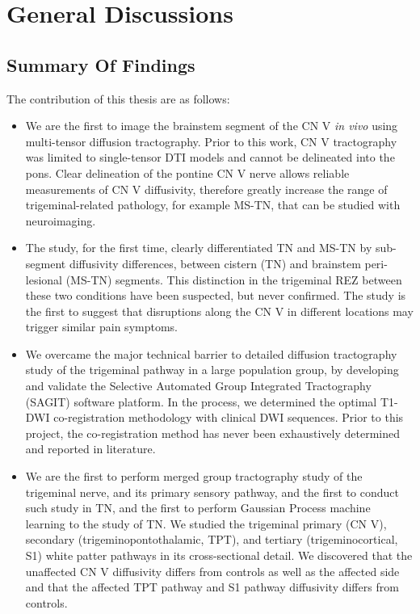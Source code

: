 \graphicspath{{images/discussions/}}

\chapter{General Discussions}

\section{Summary Of Findings}

The contribution of this thesis are as follows:

\begin{itemize}

\item We are the first to image the brainstem segment of the CN V \textit{in vivo} using multi-tensor diffusion tractography. Prior to this work, CN V tractography was limited to single-tensor DTI models and cannot be delineated into the pons. Clear delineation of the pontine CN V nerve allows reliable measurements of CN V diffusivity, therefore greatly increase the range of trigeminal-related pathology, for example MS-TN, that can be studied with neuroimaging. 

\item The study, for the first time, clearly differentiated TN and MS-TN by sub-segment diffusivity differences, between cistern (TN) and brainstem peri-lesional (MS-TN) segments. This distinction in the trigeminal REZ between these two conditions have been suspected, but never confirmed. The study is the first to suggest that disruptions along the CN V in different locations may trigger similar pain symptoms.

\item We overcame the major technical barrier to detailed diffusion tractography study of the trigeminal pathway in a large population group, by developing and validate the Selective Automated Group Integrated Tractography (SAGIT) software platform. In the process, we determined the optimal T1-DWI co-registration methodology with clinical DWI sequences. Prior to this project, the co-registration method has never been exhaustively determined and reported in literature.

\item We are the first to perform merged group tractography study of the trigeminal nerve, and its primary sensory pathway, and the first to conduct such study in TN, and the first to perform Gaussian Process machine learning to the study of TN. We studied the trigeminal primary (CN V), secondary (trigeminopontothalamic, TPT), and tertiary (trigeminocortical, S1) white patter pathways in its cross-sectional detail. We discovered that the unaffected CN V diffusivity differs from controls as well as the affected side and that the affected TPT pathway and S1 pathway diffusivity differs from controls.

\end{itemize}

